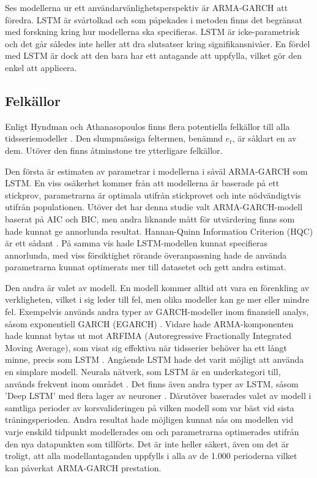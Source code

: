 \documentclass[11pt]{article}
\numberwithin{equation}{section}
\numberwithin{table}{section}
\numberwithin{figure}{section}
\begin{document}
Ses modellerna ur ett användarvänlighetsperspektiv är ARMA-GARCH att föredra. LSTM är svårtolkad och som påpekades i metoden finns det begränsat med forskning kring hur modellerna ska specifieras. LSTM är icke-parametrisk och det går således inte heller att dra slutsatser kring signifikansnivåer. En fördel med LSTM är dock att den bara har ett antagande att uppfylla, vilket gör den enkel att applicera. 

\subsection{Felkällor}
Enligt Hyndman och Athanasopoulos \parencite*[][,s.452 f.]{hyndman2018forecasting} finns flera potentiella felkällor till alla tidsseriemodeller . Den slumpmässiga feltermen, benämnd \(e_t\), är såklart en av dem. Utöver den finns åtminstone tre ytterligare felkällor. 

Den första är estimaten av parametrar i modellerna i såväl ARMA-GARCH som LSTM. En viss osäkerhet kommer från att modellerna är baserade på ett stickprov, parametrarna är optimala utifrån stickprovet och inte nödvändigtvis utifrån populationen. Utöver det har denna studie valt ARMA-GARCH-modell baserat på AIC och BIC, men andra liknande mått för utvärdering finns som hade kunnat ge annorlunda resultat. Hannan-Quinn Information Criterion (HQC) är ett sådant \parencite{hannan1979determination}. På samma vis hade LSTM-modellen kunnat specifieras annorlunda, med viss försiktighet rörande överanpassning hade de använda parametrarna kunnat optimerats mer till datasetet och gett andra estimat.

Den andra är valet av modell. En modell kommer alltid att vara en förenkling av verkligheten, vilket i sig leder till fel, men olika modeller kan ge mer eller mindre fel. Exempelvis används andra typer av GARCH-modeller inom finansiell analys, såsom exponentiell GARCH (EGARCH) \parencite{nelson1991conditional}. Vidare hade ARMA-komponenten hade kunnat bytas ut mot ARFIMA (Autoregressive Fractionally Integrated Moving Average), som visat sig effektiva när tidsserier behöver ha ett långt minne, precis som LSTM \parencite{taqqu1995estimators}. Angående LSTM hade det varit möjligt att använda en simplare modell. Neurala nätverk, som LSTM är en underkategori till, används frekvent inom området \parencite[se t.ex.][]{rather2015recurrent, li2010applications}. Det finns även andra typer av LSTM, såsom 'Deep LSTM' med flera lager av neuroner \parencite[se applikation i][]{hansson2017stock}. Därutöver baserades valet av modell i samtliga perioder av korsvalideringen på vilken modell som var bäst vid sista träningsperioden. Andra resultat hade möjligen kunnat nås om modellen vid varje enskild tidpunkt modellerades om och parametrarna optimerades utifrån den nya datapunkten som tillförts. Det är inte heller säkert, även om det är troligt, att alla modellantaganden uppfylls i alla av de 1.000 perioderna vilket kan påverkat ARMA-GARCH prestation. 
\end{document}
